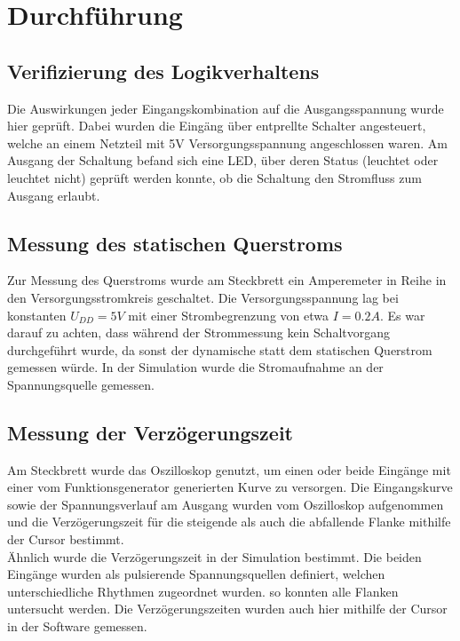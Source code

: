 \documentclass[11pt, a4paper]{article}
\begin{document}
\section*{Durchführung}

\subsection*{Verifizierung des Logikverhaltens}

Die Auswirkungen jeder Eingangskombination auf die Ausgangsspannung wurde hier geprüft. Dabei wurden die Eingäng über entprellte Schalter angesteuert, welche an einem Netzteil mit 5V Versorgungsspannung angeschlossen waren. Am Ausgang der Schaltung befand sich eine LED, über deren Status (leuchtet oder leuchtet nicht) geprüft werden konnte, ob die Schaltung den Stromfluss zum Ausgang erlaubt. 

\subsection*{Messung des statischen Querstroms}

Zur Messung des Querstroms wurde am Steckbrett ein Amperemeter in Reihe in den Versorgungsstromkreis geschaltet.
Die Versorgungsspannung lag bei konstanten $U_{DD} = 5V$ mit einer Strombegrenzung von etwa $I = 0.2A$. Es war darauf zu achten, dass während der Strommessung kein Schaltvorgang durchgeführt wurde, da sonst der dynamische statt dem statischen Querstrom gemessen würde.
In der Simulation wurde die Stromaufnahme an der Spannungsquelle gemessen. 

\subsection*{Messung der Verzögerungszeit}

Am Steckbrett wurde das Oszilloskop genutzt, um einen oder beide Eingänge mit einer vom Funktionsgenerator generierten Kurve zu versorgen. Die Eingangskurve sowie der Spannungsverlauf am Ausgang wurden vom Oszilloskop aufgenommen und die Verzögerungszeit für die steigende als auch die abfallende Flanke mithilfe der Cursor bestimmt. \\

Ähnlich wurde die Verzögerungszeit in der Simulation bestimmt. Die beiden Eingänge wurden als pulsierende Spannungsquellen definiert, welchen unterschiedliche Rhythmen zugeordnet wurden. so konnten alle Flanken untersucht werden. Die Verzögerungszeiten wurden auch hier mithilfe der Cursor in der Software gemessen.
\end{document}
